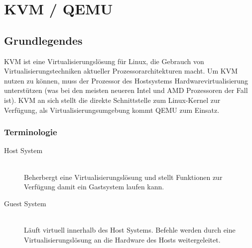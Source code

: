 

\newcommand{\SUBJECT}{Report}
\newcommand{\TITLE}{Cloud Infrastructre Lab 4}










\section{KVM / QEMU}
\subsection{Grundlegendes}
KVM ist eine Virtualisierungslösung für Linux, die Gebrauch von Virtualisierungstechniken aktueller Prozessorarchitekturen macht. Um KVM nutzen zu können, muss der Prozessor des Hostsystems Hardwarevirtualisierung unterstützen (was bei den meisten neueren Intel und AMD Prozessoren der Fall ist). KVM an sich stellt die direkte Schnittstelle zum Linux-Kernel zur Verfügung, als Virtualisierungsumgebung kommt QEMU zum Einsatz.

\subsubsection{Terminologie}
\begin{description}
	\item[Host System] \hfill \\
	Beherbergt eine Virtualisierungslösung und stellt Funktionen zur Verfügung damit ein Gastsystem laufen kann.
	\item[Guest System] \hfill \\
	Läuft virtuell innerhalb des Host Systems. Befehle werden durch eine Virtualisierungslösung an die Hardware des Hosts weitergeleitet.
\end{description}

